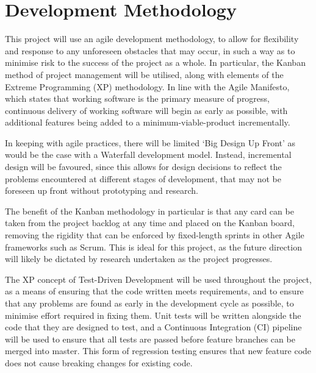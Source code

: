 \section{Development Methodology}

This project will use an agile development methodology, to allow for flexibility and response to any unforeseen obstacles that may occur, in such a way as to minimise risk to the success of the project as a whole. In particular, the Kanban method of project management will be utilised, along with elements of the Extreme Programming (XP) methodology. In line with the Agile Manifesto, which states that working software is the primary measure of progress, continuous delivery of working software will begin as early as possible, with additional features being added to a minimum-viable-product incrementally.

In keeping with agile practices, there will be limited `Big Design Up Front' as would be the case with a Waterfall development model. Instead, incremental design will be favoured, since this allows for design decisions to reflect the problems encountered at different stages of development, that may not be foreseen up front without prototyping and research.

The benefit of the Kanban methodology in particular is that any card can be taken from the project backlog at any time and placed on the Kanban board, removing the rigidity that can be enforced by fixed-length sprints in other Agile frameworks such as Scrum. This is ideal for this project, as the future direction will likely be dictated by research undertaken as the project progresses.

The XP concept of Test-Driven Development will be used throughout the project, as a means of ensuring that the code written meets requirements, and to ensure that any problems are found as early in the development cycle as possible, to minimise effort required in fixing them. Unit tests will be written alongside the code that they are designed to test, and a Continuous Integration (CI) pipeline will be used to ensure that all tests are passed before feature branches can be merged into master. This form of regression testing ensures that new feature code does not cause breaking changes for existing code.